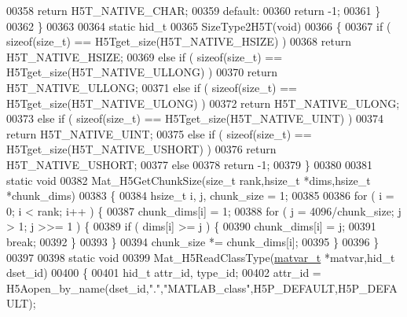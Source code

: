 \begin{DoxyCode}
00358             \textcolor{keywordflow}{return} H5T\_NATIVE\_CHAR;
00359         \textcolor{keywordflow}{default}:
00360             \textcolor{keywordflow}{return} -1;
00361     \}
00362 \}
00363 
00364 \textcolor{keyword}{static} hid\_t
00365 SizeType2H5T(\textcolor{keywordtype}{void})
00366 \{
00367     \textcolor{keywordflow}{if} ( \textcolor{keyword}{sizeof}(\textcolor{keywordtype}{size\_t}) == H5Tget\_size(H5T\_NATIVE\_HSIZE) )
00368         \textcolor{keywordflow}{return} H5T\_NATIVE\_HSIZE;
00369     \textcolor{keywordflow}{else} \textcolor{keywordflow}{if} ( \textcolor{keyword}{sizeof}(\textcolor{keywordtype}{size\_t}) == H5Tget\_size(H5T\_NATIVE\_ULLONG) )
00370         \textcolor{keywordflow}{return} H5T\_NATIVE\_ULLONG;
00371     \textcolor{keywordflow}{else} \textcolor{keywordflow}{if} ( \textcolor{keyword}{sizeof}(\textcolor{keywordtype}{size\_t}) == H5Tget\_size(H5T\_NATIVE\_ULONG) )
00372         \textcolor{keywordflow}{return} H5T\_NATIVE\_ULONG;
00373     \textcolor{keywordflow}{else} \textcolor{keywordflow}{if} ( \textcolor{keyword}{sizeof}(\textcolor{keywordtype}{size\_t}) == H5Tget\_size(H5T\_NATIVE\_UINT) )
00374         \textcolor{keywordflow}{return} H5T\_NATIVE\_UINT;
00375     \textcolor{keywordflow}{else} \textcolor{keywordflow}{if} ( \textcolor{keyword}{sizeof}(\textcolor{keywordtype}{size\_t}) == H5Tget\_size(H5T\_NATIVE\_USHORT) )
00376         \textcolor{keywordflow}{return} H5T\_NATIVE\_USHORT;
00377     \textcolor{keywordflow}{else}
00378         \textcolor{keywordflow}{return} -1;
00379 \}
00380 
00381 \textcolor{keyword}{static} \textcolor{keywordtype}{void}
00382 Mat\_H5GetChunkSize(\textcolor{keywordtype}{size\_t} rank,hsize\_t *dims,hsize\_t *chunk\_dims)
00383 \{
00384     hsize\_t i, j, chunk\_size = 1;
00385 
00386     \textcolor{keywordflow}{for} ( i = 0; i < rank; i++ ) \{
00387         chunk\_dims[i] = 1;
00388         \textcolor{keywordflow}{for} ( j = 4096/chunk\_size; j > 1; j >>= 1 ) \{
00389             \textcolor{keywordflow}{if} ( dims[i] >= j ) \{
00390                 chunk\_dims[i] = j;
00391                 \textcolor{keywordflow}{break};
00392             \}
00393         \}
00394         chunk\_size *= chunk\_dims[i];
00395     \}
00396 \}
00397 
00398 \textcolor{keyword}{static} \textcolor{keywordtype}{void}
00399 Mat\_H5ReadClassType(\hyperlink{group___m_a_t_structmatvar__t}{matvar\_t} *matvar,hid\_t dset\_id)
00400 \{
00401     hid\_t attr\_id, type\_id;
00402     attr\_id = H5Aopen\_by\_name(dset\_id,\textcolor{stringliteral}{"."},\textcolor{stringliteral}{"MATLAB\_class"},H5P\_DEFAULT,H5P\_DEFAULT);

\end{DoxyCode}
